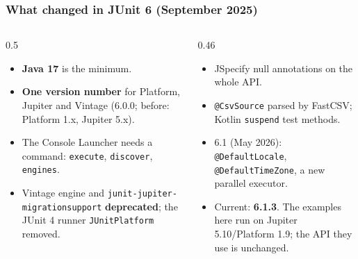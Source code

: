 \documentclass[aspectratio=169,10pt,compress]{beamer}
\begin{document}
\begin{frame}[t,fragile] \frametitle{What changed in JUnit 6 (September 2025)}
  \begin{columns}[T]
    \begin{column}{0.5\textwidth}
      \begin{itemize}\small
        \item \textbf{Java 17} is the minimum.
        \item \textbf{One version number} for Platform, Jupiter and Vintage (6.0.0; before: Platform 1.x, Jupiter 5.x).
        \item The Console Launcher needs a command: \texttt{execute}, \texttt{discover}, \texttt{engines}.
        \item Vintage engine and \texttt{junit-jupiter-migrationsupport} \textbf{deprecated}; the JUnit 4 runner
              \texttt{JUnitPlatform} removed.
      \end{itemize}
    \end{column}
    \begin{column}{0.46\textwidth}
      \begin{itemize}\small
        \item JSpecify null annotations on the whole API.
        \item \texttt{@CsvSource} parsed by FastCSV; Kotlin \texttt{suspend} test methods.
        \item 6.1 (May 2026): \texttt{@DefaultLocale}, \texttt{@DefaultTimeZone}, a new parallel executor.
        \item Current: \textbf{6.1.3}. The examples here run on Jupiter 5.10/Platform 1.9; the API they use is unchanged.
      \end{itemize}
    \end{column}
  \end{columns}
\end{frame}

\end{document}
